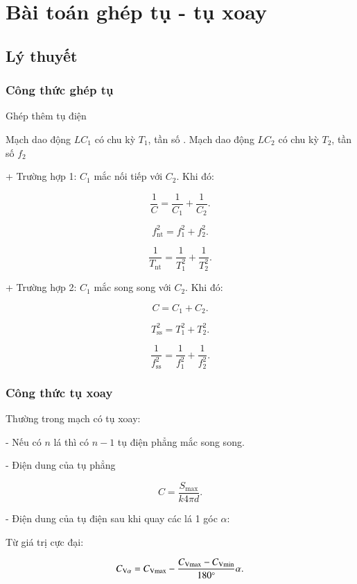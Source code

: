 \let\lesson\undefined
\newcommand{\lesson}{\phantomlesson{Bài 20: Mạch dao động}}
\chapter[Bài toán ghép tụ - tụ xoay]{Bài toán ghép tụ - tụ xoay}
\section{Lý thuyết}

\subsection{Công thức ghép tụ}

Ghép thêm tụ điện

Mạch dao động $LC_1$ có chu kỳ $T_1$, tần số . Mạch dao động $LC_2$ có chu kỳ $T_2$, tần số $f_2$

+ Trường hợp 1: $C_1$ mắc nối tiếp với $C_2$. Khi đó:

$$\dfrac{1}{C}= \dfrac{1}{C_1}+ \dfrac{1}{C_2}.$$

$$f_\text{nt}^2=f_1^2+f_2^2.$$

$$\dfrac{1}{T_\text{nt}}= \dfrac{1}{T^2_1}+ \dfrac{1}{T^2_2}.$$

+ Trường hợp 2: $C_1$ mắc song song với $C_2$. Khi đó:


$$C= C_1 + C_2.$$

$$T_\text{ss}^2=T_1^2+T_2^2.$$

$$\dfrac{1}{f_\text{ss}^2}= \dfrac{1}{f^2_1}+ \dfrac{1}{f^2_2}.$$





\subsection{Công thức tụ xoay}

Thường trong mạch có tụ xoay:

- Nếu có $n$ lá thì có $n - 1$ tụ điện phẳng mắc song song.

- Điện dung của tụ phẳng

$$C = \dfrac{S_\text{max}}{k4\pi d}.$$

- Điện dung của tụ điện sau khi quay các lá 1 góc $\alpha$:

Từ giá trị cực đại:

$$C_{\text V{\alpha}}= C_\text{V\text{max}} - \dfrac{C_\text{V\text{max}}- C_\text{V\text{min}}}{180^\circ}\alpha.$$

